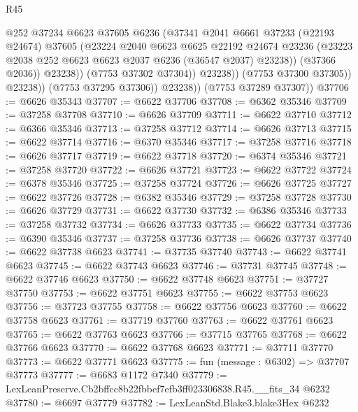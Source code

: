 \begin{lexlean}{R45}
\begin{coremodule}
{                            @252
                            @37234
                            @6623
                            @37605
                            @6236
                            (@37341
                              @2041
                              @6661
                              @37233
                              (@22193 @24674)
                              @37605
                              (@23224
                                @2040
                                @6623
                                @6625
                                @22192
                                @24674
                                @23236
                                (@23223 @2038 @252 @6623 @6623 @2037 @6236 (@36547 @2037) @23238))
                              (@37366 @2036))
                            @23238))
                        (@7753 @37302 @37304))
                      @23238))
                  (@7753 @37300 @37305))
                @23238))
            (@7753 @37295 @37306))
          @23238))
      (@7753 @37289 @37307))
@37706 := @6626 @35343
@37707 := @6622 @37706
@37708 := @6362 @35346
@37709 := @37258 @37708
@37710 := @6626 @37709
@37711 := @6622 @37710
@37712 := @6366 @35346
@37713 := @37258 @37712
@37714 := @6626 @37713
@37715 := @6622 @37714
@37716 := @6370 @35346
@37717 := @37258 @37716
@37718 := @6626 @37717
@37719 := @6622 @37718
@37720 := @6374 @35346
@37721 := @37258 @37720
@37722 := @6626 @37721
@37723 := @6622 @37722
@37724 := @6378 @35346
@37725 := @37258 @37724
@37726 := @6626 @37725
@37727 := @6622 @37726
@37728 := @6382 @35346
@37729 := @37258 @37728
@37730 := @6626 @37729
@37731 := @6622 @37730
@37732 := @6386 @35346
@37733 := @37258 @37732
@37734 := @6626 @37733
@37735 := @6622 @37734
@37736 := @6390 @35346
@37737 := @37258 @37736
@37738 := @6626 @37737
@37740 := @6622 @37738 @6623
@37741 := @37735 @37740
@37743 := @6622 @37741 @6623
@37745 := @6622 @37743 @6623
@37746 := @37731 @37745
@37748 := @6622 @37746 @6623
@37750 := @6622 @37748 @6623
@37751 := @37727 @37750
@37753 := @6622 @37751 @6623
@37755 := @6622 @37753 @6623
@37756 := @37723 @37755
@37758 := @6622 @37756 @6623
@37760 := @6622 @37758 @6623
@37761 := @37719 @37760
@37763 := @6622 @37761 @6623
@37765 := @6622 @37763 @6623
@37766 := @37715 @37765
@37768 := @6622 @37766 @6623
@37770 := @6622 @37768 @6623
@37771 := @37711 @37770
@37773 := @6622 @37771 @6623
@37775 := fun (message : @6302) => @37707 @37773
@37777 := @6683 @1172 @7340
@37779 := LexLeanPreserve.Cb2bffcc8b22fbbef7efb3ff023306838.R45.__fits_34 @6232
@37780 := @6697 @37779
@37782 := LexLeanStd.Blake3.blake3Hex @6232
}
\end{coremodule}
\end{lexlean}
